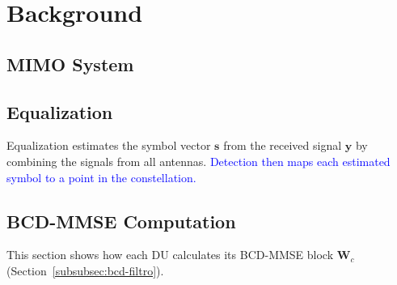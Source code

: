 \chapter{Background}\label{chap:fundamentacao}

\section{MIMO System}\label{sec:sistemas-MIMO}











\section{Equalization}\label{subsec:equalization}
Equalization estimates the symbol vector $\mathbf s$ from the received signal $\mathbf y$ by combining the signals from all antennas. \textcolor{blue}{Detection then maps each estimated symbol to a point in the constellation.}





\section{BCD-MMSE Computation}\label{sec:calculo-bcd}\label{sec:dbp-ruido}
This section shows how each DU calculates its BCD-MMSE block $\mathbf W_c$ (Section~\ref{subsubsec:bcd-filtro}).







